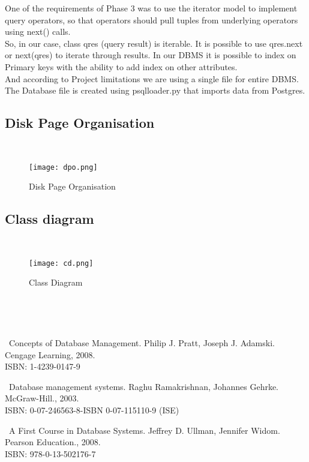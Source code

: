 \documentclass{article}
\begin{document}
One of the requirements of Phase 3 was to use the iterator model to implement query operators, so that operators should pull tuples from underlying operators using next() calls. \\
So, in our case, class qres (query result) is iterable. It is possible to use qres.next or next(qres) to iterate through results.
In our DBMS it is possible to index on Primary keys with the ability to add index on other attributes. \\
And according to Project limitations we are using a single file for entire DBMS. The Database file is created using psqlloader.py that imports data from Postgres.

\newpage
\subsection{Disk Page Organisation}
~
\newline
\begin{figure}[h!]
  \centering
      \texttt{[image: dpo.png]}
  \caption{Disk Page Organisation}
\end{figure}

\newpage
\subsection{Class diagram}
~
~
\begin{figure}[h!]
  \centering
      \texttt{[image: cd.png]}
  \caption{Class Diagram}
\end{figure}
~
~

~
\\

\newpage
\begin{thebibliography}{1}

\ Concepts of Database Management. Philip J. Pratt, Joseph J. Adamski. Cengage Learning, 2008. \\ ISBN: 1-4239-0147-9

\ Database management systems. Raghu Ramakrishnan, Johannes Gehrke. McGraw-Hill., 2003. \\ ISBN: 0-07-246563-8-ISBN 0-07-115110-9 (ISE)

\ A First Course in Database Systems. Jeffrey D. Ullman, Jennifer Widom. Pearson Education., 2008. \\ ISBN: 978-0-13-502176-7


\end{thebibliography}
\end{document}
